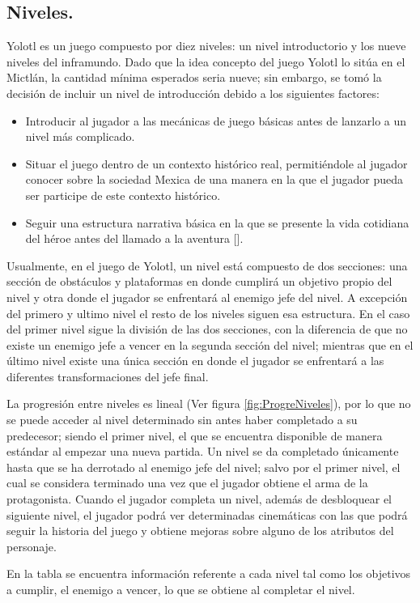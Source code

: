 \subsection{Niveles.}
Yolotl es un juego compuesto por diez niveles: un nivel introductorio y los nueve niveles del inframundo.  Dado que la idea concepto del juego Yolotl lo sitúa en el Mictlán, la cantidad mínima esperados seria nueve; sin embargo, se tomó la decisión de incluir un nivel de introducción debido a los siguientes factores: 

\begin{itemize}
	\item Introducir al jugador a las mecánicas de juego básicas antes de lanzarlo a un nivel más complicado.
	\item Situar el juego dentro de un contexto histórico real, permitiéndole al jugador conocer sobre la sociedad Mexica de una manera en la que el jugador pueda ser participe de este contexto histórico.
	\item Seguir una estructura narrativa básica en la que se presente la vida cotidiana del héroe antes del llamado a la aventura [].
\end{itemize}

Usualmente, en el juego de Yolotl, un nivel está compuesto de dos secciones: una sección de obstáculos y plataformas en donde cumplirá un objetivo propio del nivel y otra donde el jugador se enfrentará al enemigo jefe del nivel. A excepción del primero y ultimo nivel el resto de los niveles siguen esa estructura. En el caso del primer nivel sigue la división de las dos secciones, con la diferencia de que no existe un enemigo jefe a vencer en la segunda sección del nivel; mientras que en el último nivel existe una única sección en donde el jugador se enfrentará a las diferentes transformaciones del jefe final.
\\
\par
La progresión entre niveles es lineal (Ver figura \ref{fig:ProgreNiveles}), por lo que no se puede acceder al nivel determinado sin antes haber completado a su predecesor; siendo el primer nivel, el que se encuentra disponible de manera estándar al empezar una nueva partida. Un nivel se da completado únicamente hasta que se ha derrotado al enemigo jefe del nivel; salvo por el primer nivel, el cual se considera terminado una vez que el jugador obtiene el arma de la protagonista. Cuando el jugador completa un nivel, además de desbloquear el siguiente nivel, el jugador podrá ver determinadas cinemáticas con las que podrá seguir la historia del juego y obtiene mejoras sobre alguno de los atributos del personaje.
\\
\par
En la tabla se encuentra información referente a cada nivel tal como los objetivos a cumplir, el enemigo a vencer, lo que se obtiene al completar el nivel.

